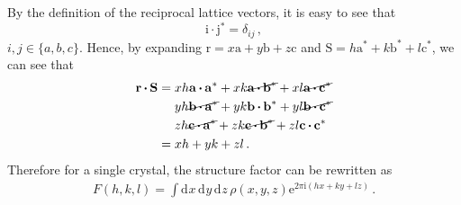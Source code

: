 \documentclass{article}
\theoremstyle{plain}\theoremheaderfont{\normalfont\itshape}\theorembodyfont{\rmfamily}\theoremseparator{.}\newtheorem*{rem}{Remark}\newtheorem*{ex}{Example}\newtheorem*{proof}{Proof}\newtheorem*{altp}{Alternative proof}
\theoremstyle{plain}\theoremheaderfont{\normalfont\bfseries}\theorembodyfont{\rmfamily}\theoremseparator{.}\newtheorem{thm}{Theorem}[section]\newtheorem{lem}[thm]{Lemma}\newtheorem{prop}[thm]{Proposition}\newtheorem*{cor}{Corollary}\newtheorem{defn}[thm]{Definition}\newtheorem{clm}[thm]{Claim}\newtheorem{clminproof}{Claim}\newtheorem*{law}{Law}\newtheorem{pos}[thm]{Postulate}
\theoremstyle{break}\theoremheaderfont{\normalfont\itshape}\theorembodyfont{\rmfamily}\theoremseparator{.\medskip}\newtheorem*{proofskip}{Proof}\newtheorem*{exs}{Examples}\newtheorem*{rems}{Remarks}
\theoremstyle{break}\theoremheaderfont{\normalfont\bfseries}\theorembodyfont{\rmfamily}\theoremseparator{.\medskip}\newtheorem{lemskip}[thm]{Lemma}\newtheorem{defnskip}[thm]{Definition}\newtheorem{propskip}[thm]{Proposition}\newtheorem{thmskip}[thm]{Theorem}
\numberwithin{equation}{section}
\newcommand{\ii}{\mathrm{i}}
\newcommand{\ee}{\mathrm{e}}
\newcommand{\dd}[2][]{\mathrm{d}^{#1} #2\,}
\newcommand{\vb}[1]{\bm{\mathrm{#1}}}
\newcommand{\vdot}{\,\bm{\mathrm{\cdot}}\,}
\begin{document}
    By the definition of the reciprocal lattice vectors, it is easy to see that
    \begin{equation}
        \vb{i}\vdot\vb{j}^*=\delta_{ij}\,,
    \end{equation}
    \(i,j\in\{a,b,c\}\). Hence, by expanding \(\vb{r}=x\vb{a}+y\vb{b}+z\vb{c}\) and \(\vb{S}=h\vb{a}^*+k\vb{b}^*+l\vb{c}^*\), we can see that
    \begin{align}
        \vb{r}\vdot\vb{S}&=xh\vb{a}\vdot\vb{a}^*+xk\cancel{\vb{a}\vdot\vb{b}^*}+xl\cancel{\vb{a}\vdot\vb{c}^*}\notag\\
        &\quad\ yh\cancel{\vb{b}\vdot\vb{a}^*}+yk\vb{b}\vdot\vb{b}^*+yl\cancel{\vb{b}\vdot\vb{c}^*}\notag\\
        &\quad\ zh\cancel{\vb{c}\vdot\vb{a}^*}+zk\cancel{\vb{c}\vdot\vb{b}^*}+zl\vb{c}\vdot\vb{c}^*\notag\\
        &=xh+yk+zl\,.
    \end{align}
    Therefore for a single crystal, the structure factor can be rewritten as
    \begin{align}
        F(h,k,l)=\int\dd{x}\dd{y}\dd{z}\rho(x,y,z)\ee^{2\pi \ii(hx+ky+lz)}\,.
    \end{align}
\end{document}
